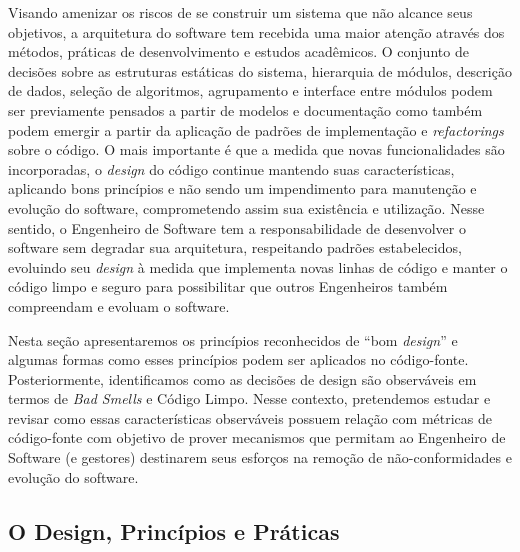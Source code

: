 Visando amenizar os riscos de se construir um sistema que não alcance seus objetivos, a arquitetura do software tem recebida uma maior atenção através dos métodos, práticas de desenvolvimento e estudos acadêmicos.
%
O conjunto de decisões sobre as estruturas estáticas do sistema, hierarquia de módulos, descrição de dados, seleção de algoritmos, agrupamento e interface entre módulos podem ser previamente pensados a partir de modelos e documentação como também podem emergir a partir da aplicação de padrões de implementação e \emph{refactorings} sobre o código.
%
O mais importante é que a medida que novas funcionalidades são incorporadas, o \emph{design} do código continue mantendo suas características, aplicando bons princípios e não sendo um impendimento para manutenção e evolução do software, comprometendo assim sua existência e utilização.
%
Nesse sentido, o Engenheiro de Software tem a responsabilidade de desenvolver o software sem degradar sua arquitetura, respeitando padrões estabelecidos, evoluindo seu \emph{design} à medida que implementa novas linhas de código e manter o código limpo e seguro para possibilitar que outros Engenheiros também compreendam e evoluam o software.

Nesta seção apresentaremos os princípios reconhecidos de ``bom \emph{design}'' e algumas formas como esses princípios podem ser aplicados no código-fonte.
%
Posteriormente, identificamos como as decisões de design são observáveis em termos de \emph{Bad Smells} e Código Limpo.
%
Nesse contexto, pretendemos estudar e revisar como essas características observáveis possuem relação com métricas de código-fonte com objetivo de prover mecanismos que permitam ao Engenheiro de Software (e gestores) destinarem seus esforços na remoção de não-conformidades e evolução do software.


\subsection{O Design, Princípios e Práticas}
\label{sec-principles-practises}

